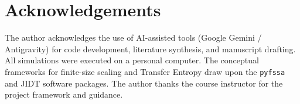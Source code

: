 \documentclass[12pt, a4paper]{article}
\begin{document}
\section*{Acknowledgements}

The author acknowledges the use of AI-assisted tools (Google Gemini / Antigravity) for code development, literature synthesis, and manuscript drafting. All simulations were executed on a personal computer. The conceptual frameworks for finite-size scaling and Transfer Entropy draw upon the \texttt{pyfssa} and JIDT software packages. The author thanks the course instructor for the project framework and guidance.




\end{document}
